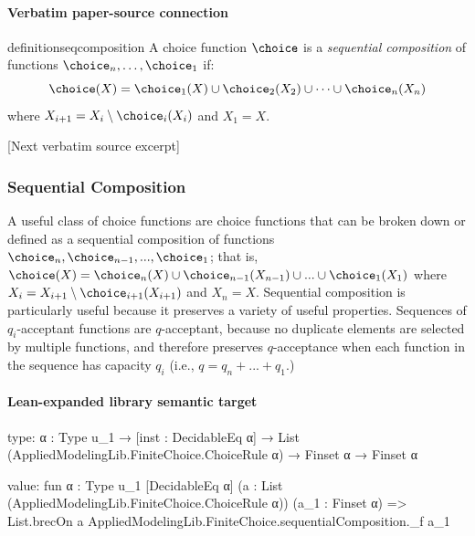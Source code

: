 \documentclass[10pt]{article}
\begin{document}
\paragraph{Verbatim paper-source connection}
\begin{ReviewVerbatim}
\begin{restatable}{definition}{seqcomposition} \label{def:seq-composition}
A choice function $\choice$ is a \textit{sequential composition} of functions $\choice_n, \ldots, \choice_1$ if:
$$\choice(X) = \choice_1(X) \cup \choice_{2}(X_{2}) \cup \cdots \cup \choice_n(X_n)$$
where $X_{i+1}= X_{i} \setminus \choice_{i}(X_{i})$ and $X_1 = X$.
\end{restatable}

[Next verbatim source excerpt]

\subsubsection{Sequential Composition} \label{sec:seq-proofs}
A useful class of choice functions are choice functions that can be broken down or defined as a sequential composition of functions $\choice_n, \choice_{n-1}, ..., \choice_1$; that is,
$\choice(X) = \choice_n(X) \cup \choice_{n-1}(X_{n-1}) \cup ... \cup \choice_1(X_1)$ where $X_i = X_{i+1} \setminus\choice_{i+1}(X_{i+1})$ and $X_n = X$. Sequential composition is particularly useful because it preserves a variety of useful properties. Sequences of $q_i$-acceptant functions are $q$-acceptant, because no duplicate elements are selected by multiple functions, and therefore preserves $q$-acceptance when each function in the sequence has capacity $q_i$ (i.e., $q = q_n + ... + q_1$.)
\seqcomposition*
\end{ReviewVerbatim}



\paragraph{Lean-expanded library semantic target}
\begin{ReviewVerbatim}
type:
{α : Type u_1} → [inst : DecidableEq α] → List (AppliedModelingLib.FiniteChoice.ChoiceRule α) → Finset α → Finset α

value:
fun {α : Type u_1} [DecidableEq α] (a : List (AppliedModelingLib.FiniteChoice.ChoiceRule α)) (a_1 : Finset α) =>
  List.brecOn a AppliedModelingLib.FiniteChoice.sequentialComposition._f a_1
\end{ReviewVerbatim}
\end{document}
